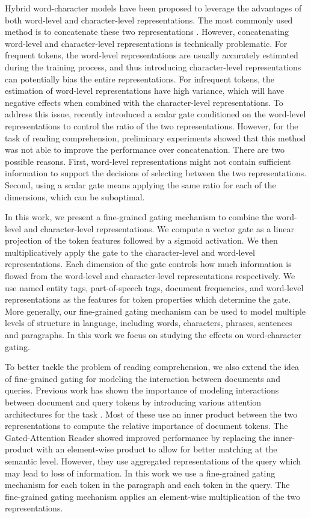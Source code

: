 \documentclass{article} \usepackage{iclr2017_conference,times}
\begin{document}
Hybrid word-character models have been proposed to leverage the advantages of both word-level and character-level representations. The most commonly used method is to concatenate these two representations \citep{yang2016multi}. However, concatenating word-level and character-level representations is technically problematic. For frequent tokens, the word-level representations are usually accurately estimated during the training process, and thus introducing character-level representations can potentially bias the entire representations. For infrequent tokens, the estimation of word-level representations have high variance, which will have negative effects when combined with the character-level representations. To address this issue, recently \cite{miyamoto2016gated} introduced a scalar gate conditioned on the word-level representations to control the ratio of the two representations. However, for the task of reading comprehension, preliminary experiments showed that this method was not able to improve the performance over concatenation. There are two possible reasons. First, word-level representations might not contain sufficient information to support the decisions of selecting between the two representations. Second, using a scalar gate means applying the same ratio for each of the dimensions, which can be suboptimal.

In this work, we present a fine-grained gating mechanism to combine the word-level and character-level representations. We compute a vector gate as a linear projection of the token features followed by a sigmoid activation. We then multiplicatively apply the gate to the character-level and word-level representations. Each dimension of the gate controls how much information is flowed from the word-level and character-level representations respectively. We use named entity tags, part-of-speech tags, document frequencies, and word-level representations as the features for token properties which determine the gate. More generally, our fine-grained gating mechanism can be used to model multiple levels of structure in language, including words, characters, phrases, sentences and paragraphs. In this work we focus on studying the effects on word-character gating.

To better tackle the problem of reading comprehension, we also extend the idea of fine-grained gating for modeling the interaction between documents and queries. Previous work has shown the importance of modeling interactions between document and query tokens by introducing various attention architectures for the task \citep{hermann2015teaching,kadlec2016text}. Most of these use an inner product between the two representations to compute the relative importance of document tokens. The Gated-Attention Reader \citep{dhingra2016gated} showed improved performance by replacing the inner-product with an element-wise product to allow for better matching at the semantic level. However, they use aggregated representations of the query which may lead to loss of information. In this work we use a fine-grained gating mechanism for each token in the paragraph and each token in the query. The fine-grained gating mechanism applies an element-wise multiplication of the two representations.
\end{document}
